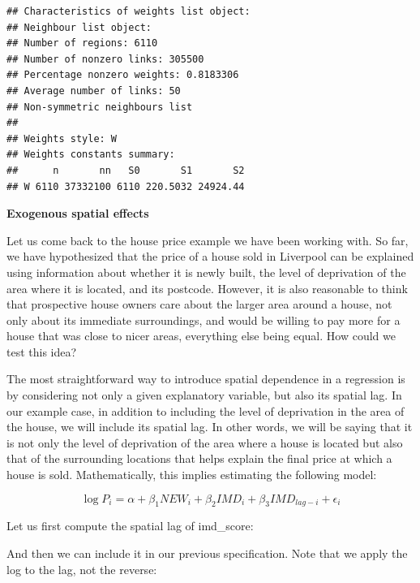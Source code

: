 \documentclass[
]{book}
\newenvironment{Shaded}{\begin{snugshade}}{\end{snugshade}}
\newcommand{\FunctionTok}[1]{\textcolor[rgb]{0.00,0.00,0.00}{#1}}
\newcommand{\NormalTok}[1]{#1}
\newcommand{\OtherTok}[1]{\textcolor[rgb]{0.56,0.35,0.01}{#1}}
\newcommand{\SpecialCharTok}[1]{\textcolor[rgb]{0.00,0.00,0.00}{#1}}
\begin{document}
\begin{verbatim}
## Characteristics of weights list object:
## Neighbour list object:
## Number of regions: 6110 
## Number of nonzero links: 305500 
## Percentage nonzero weights: 0.8183306 
## Average number of links: 50 
## Non-symmetric neighbours list
## 
## Weights style: W 
## Weights constants summary:
##      n       nn   S0       S1       S2
## W 6110 37332100 6110 220.5032 24924.44
\end{verbatim}

\textbf{Exogenous spatial effects}

Let us come back to the house price example we have been working with. So far, we have hypothesized that the price of a house sold in Liverpool can be explained using information about whether it is newly built, the level of deprivation of the area where it is located, and its postcode. However, it is also reasonable to think that prospective house owners care about the larger area around a house, not only about its immediate surroundings, and would be willing to pay more for a house that was close to nicer areas, everything else being equal. How could we test this idea?

The most straightforward way to introduce spatial dependence in a regression is by considering not only a given explanatory variable, but also its spatial lag. In our example case, in addition to including the level of deprivation in the area of the house, we will include its spatial lag. In other words, we will be saying that it is not only the level of deprivation of the area where a house is located but also that of the surrounding locations that helps explain the final price at which a house is sold. Mathematically, this implies estimating the following model:

\[
\log{P_i} = \alpha + \beta_{1} NEW_i + \beta_{2} IMD_i + \beta_{3} IMD_{lag-i} + \epsilon_i
\]

Let us first compute the spatial lag of imd\_score:

\begin{Shaded}
\end{Shaded}

And then we can include it in our previous specification. Note that we apply the log to the lag, not the reverse:
\end{document}
